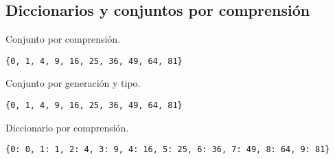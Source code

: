\subsection{Diccionarios y conjuntos por comprensión}

\begin{code} Conjunto por comprensión.
\begin{Shaded}
\begin{Highlighting}[]
\OperatorTok{*} \NormalTok{(}\NormalTok{)\}}
\end{Highlighting}
\end{Shaded}

\begin{verbatim}
{0, 1, 4, 9, 16, 25, 36, 49, 64, 81}

\end{verbatim}
\end{code}

\begin{code} Conjunto por generación y tipo.

\begin{Shaded}
\begin{Highlighting}[]
\OperatorTok{*} \NormalTok{(}\NormalTok{))}
\end{Highlighting}
\end{Shaded}

\begin{verbatim}
{0, 1, 4, 9, 16, 25, 36, 49, 64, 81}

\end{verbatim}
\end{code}

\begin{code} Diccionario por comprensión.

\begin{Shaded}
\begin{Highlighting}[]
\OperatorTok{*} \NormalTok{(}\NormalTok{)\}}
\end{Highlighting}
\end{Shaded}

\begin{verbatim}
{0: 0, 1: 1, 2: 4, 3: 9, 4: 16, 5: 25, 6: 36, 7: 49, 8: 64, 9: 81}

\end{verbatim}
\end{code}

